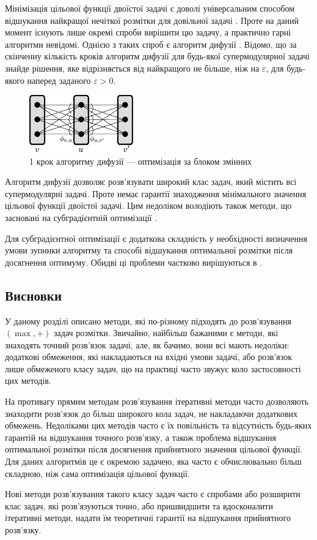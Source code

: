 Мінімізація цільової функції двоїстої задачі є доволі універсальним способом відшукання найкращої
нечіткої розмітки для довільної задачі \cite{diffusion_shlezinger,savchynskyy,SchlGig_1_usim2007}. Проте на даний момент існують лише окремі спроби вирішити цю задачу,
а практично гарні алгоритми невідомі.
Однією з таких спроб є алгоритм дифузії \cite{diffusion_shlezinger, savchynskyy}.
Відомо, що за скінченну кількість кроків алгоритм дифузії для будь-якої супермодулярної задачі
знайде рішення, яке відрізняється від найкращого не більше, ніж на $\varepsilon$,
для будь-якого наперед заданого $\varepsilon>0$.

\begin{figure}[h]
  \centering
  \includegraphics[width=0.4\textwidth]{images/One-elementary-step-of_diffusion.png}
  \caption{1 крок алгоритму дифузії --- оптимізація за блоком змінних}
  \label{fig:graph_example}
\end{figure}

Алгоритм дифузії дозволяє розв'язувати широкий клас задач, який містить всі
супермодулярні задачі. Проте немає гарантії знаходження мінімального
значення цільової функції двоїстої задачі. Цим недоліком володіють також
методи, що засновані на субградієнтній оптимізації \cite{Shor1985}.

Для субградієнтної оптимізації є додаткова складність у необхідності визначення
умови зупинки алгоритму та способі відшукання оптимальної розмітки
після досягнення оптимуму. Обидві ці проблеми частково вирішуються в \cite{lopatka_stop_cond}.

\subsection{Висновки}

У даному розділі описано методи, які по-різному підходять до
розв'язування \((\max,+)\) задач розмітки. Звичайно, найбільш бажаними є методи,
які знаходять точний розв'язок задачі, але, як бачимо, вони всі мають недоліки:
додаткові обмеження, які накладаються на вхідні умови задачі, або розв'язок
лише обмеженого класу задач, що на практиці часто звужує коло застосовності
цих методів.

На противагу прямим методам розв'язування ітеративні методи часто дозволяють
знаходити розв'язок до більш широкого кола задач, не накладаючи додаткових
обмежень. Недоліками цих методів часто є їх повільність та відсутність
будь-яких гарантій на відшукання точного розв'язку, а також проблема відшукання
оптимальної розмітки після досягнення прийнятного значення цільової функції.
Для даних алгоритмів це є окремою задачею, яка часто є обчислювально більш
складною, ніж сама оптимізація цільової функції.

Нові методи розв'язування такого класу задач часто є спробами або розширити
клас задач, які розв'язуються точно, або пришвидшити та вдосконалити
ітеративні методи, надати їм теоретичні гарантії на відшукання
прийнятного розв'язку.
